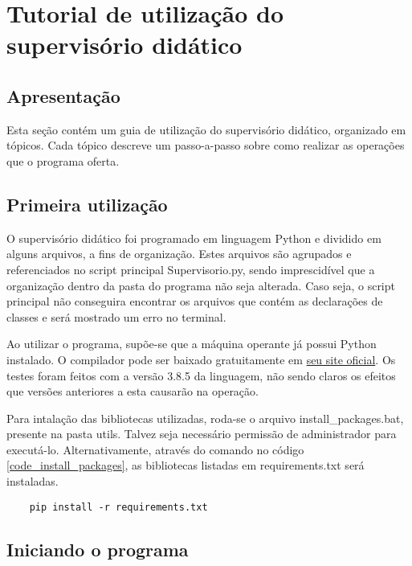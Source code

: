 \chapter{Tutorial de utilização do supervisório didático} \label{Chap:Apendice1}

\section{Apresentação}

Esta seção contém um guia de utilização do supervisório didático, organizado em tópicos. Cada tópico descreve um passo-a-passo sobre como realizar as operações que o programa oferta.

\section {Primeira utilização}

O supervisório didático foi programado em linguagem Python e dividido em alguns arquivos, a fins de organização. Estes arquivos são agrupados e referenciados no script principal Supervisorio.py, sendo imprescidível que a organização dentro da pasta do programa não seja alterada. Caso seja, o script principal não conseguira encontrar os arquivos que contém as declarações de classes e será mostrado um erro no terminal.

Ao utilizar o programa, supõe-se que a máquina operante já possui Python instalado. O compilador pode ser baixado gratuitamente em \href{https://www.python.org/}{seu site oficial}. Os testes foram feitos com a versão 3.8.5 da linguagem, não sendo claros os efeitos que versões anteriores a esta causarão na operação.

Para intalação das bibliotecas utilizadas, roda-se o arquivo install\_packages.bat, presente na pasta utils. Talvez seja necessário permissão de administrador para executá-lo. Alternativamente, através do comando no código \ref{code_install_packages}, as bibliotecas listadas em requirements.txt será instaladas.

\begin{code}
	\begin{lstlisting}
	pip install -r requirements.txt
	\end{lstlisting}
	\label{code_install_packages}
\end{code}

\section{Iniciando o programa}


